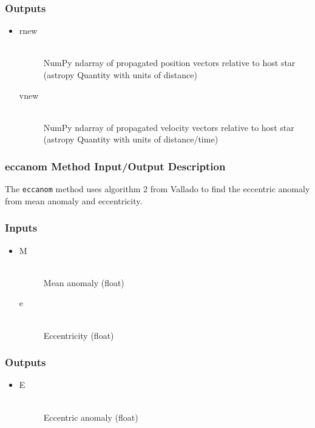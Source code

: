 \documentclass[cleanfoot]{asme2ej}
\begin{document}
\subsubsection*{Outputs}
\begin{itemize}
    \item 
    \begin{description}
        \item[rnew] \hfill \\
        NumPy ndarray of propagated position vectors relative to host star (astropy Quantity with units of distance)
        \item[vnew] \hfill \\
        NumPy ndarray of propagated velocity vectors relative to host star (astropy Quantity with units of distance/time)
    \end{description}
\end{itemize}

\subsubsection{eccanom Method Input/Output Description} \label{sec:eccanomtask}
The \verb+eccanom+ method uses algorithm 2 from Vallado to find the eccentric anomaly from mean anomaly and eccentricity.

\subsubsection*{Inputs}
\begin{itemize}
    \item 
    \begin{description}
        \item[M] \hfill \\
        Mean anomaly (float)
        \item[e] \hfill \\
        Eccentricity (float)
    \end{description}
\end{itemize}

\subsubsection*{Outputs}
\begin{itemize}
    \item 
    \begin{description}
        \item[E] \hfill \\
        Eccentric anomaly (float)
    \end{description}
\end{itemize}
\end{document}
